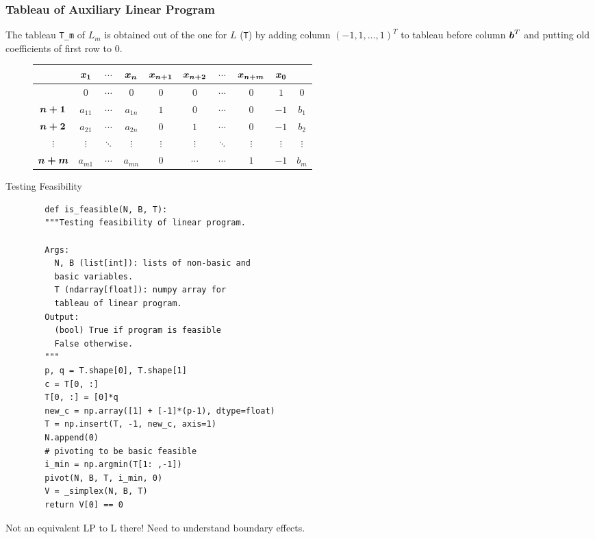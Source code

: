 \documentclass[32pt, aspectratio = 169]{beamer}
\begin{document}
\begin{frame}
  \frametitle{Tableau of Auxiliary Linear Program}
  The tableau \texttt{T_m} of $L_m$ is obtained out of the
  one for $L$ (\texttt{T}) by adding column
  $(-1, 1, \ldots, 1)^T$ to tableau before column $\boldsymbol{b}^T$ and
  putting old coefficients of first row to $0$.
  \begin{figure}
    \begin{tabular}{c|ccc|ccccc|c|}
      & \alert{$\boldsymbol{x_1}$} & \alert{$\cdots$} & \alert{$\boldsymbol{x_n}$} & \alert{$\boldsymbol{x_{n+1}}$} & \alert{$\boldsymbol{x_{n+2}}$} & \alert{$\cdots$} & \alert{$\boldsymbol{x_{n+m}}$} & \alert{$\boldsymbol{x_0}$} &  \\
      \hline
      & $0$ & $\cdots$ & $0$ & $0$ & $0$ & $\cdots$ & $0$ & $1$ & $0$ \\
      \hline
      \alert{$\boldsymbol{n+1}$} & $a_{11}$ & $\cdots$ & $a_{1n}$ & $1$ & $0$ & $\cdots$ & $0$ & $-1$ & $b_1$ \\
      \alert{$\boldsymbol{n+2}$}& $a_{21}$ & $\cdots$ & $a_{2n}$ & $0$ & $1$ & $\cdots$ & $0$ & $-1$ & $b_2$ \\
      \alert{$\vdots$}& $\vdots$ & $\ddots$ & $\vdots$ & $\vdots$ & $\vdots$ & $\ddots$ & $\vdots$ & $\vdots$ & $\vdots$ \\
      \alert{$\boldsymbol{n+m}$} & $a_{m1}$ & $\cdots$  & $a_{mn}$  & $0$ & $\cdots$ & $\cdots$ & $1$ & $-1$ & $b_m$
    \end{tabular}
  \end{figure}
\end{frame}

\begin{frame}[fragile]{Testing Feasibility}
  \begin{overlayarea}{1.05\textwidth}{.6\textheight}
  \setlength\columnseprule{.1pt}
  \begin{multicols}{2}
    \scriptsize{
      \begin{verbatim}
        def is_feasible(N, B, T):
        """Testing feasibility of linear program.

        Args:
          N, B (list[int]): lists of non-basic and
          basic variables.
          T (ndarray[float]): numpy array for
          tableau of linear program.
        Output:
          (bool) True if program is feasible
          False otherwise.
        """
        p, q = T.shape[0], T.shape[1]
        c = T[0, :]
        T[0, :] = [0]*q
        new_c = np.array([1] + [-1]*(p-1), dtype=float)
        T = np.insert(T, -1, new_c, axis=1)
        N.append(0)
        # pivoting to be basic feasible
        i_min = np.argmin(T[1: ,-1])
        pivot(N, B, T, i_min, 0)
        V = _simplex(N, B, T)
        return V[0] == 0
      \end{verbatim}
    }
  \end{multicols}
\end{overlayarea}
\pause
  \begin{tcolorbox}[
    enhanced,
    parbox = false,
    colback = mLightBrown!30!white,
    colframe = mLightBrown!30!white,
    arc = 0mm,
    ]
    Not an equivalent LP to L there! Need to understand boundary effects.
  \end{tcolorbox}
\end{frame}
\end{document}

